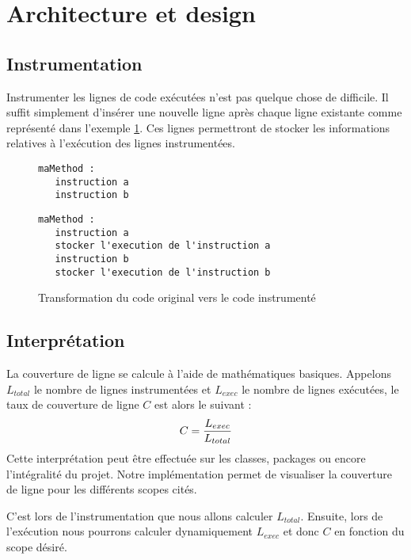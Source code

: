\section{Architecture et design}

\subsection{Instrumentation}
\label{instrumentation}

Instrumenter les lignes de code exécutées n'est pas quelque chose de difficile. Il suffit simplement d'insérer une nouvelle ligne après chaque ligne existante comme représenté dans l'exemple   \ref{example_instrumentation}. Ces lignes permettront de stocker les informations relatives à l'exécution des lignes instrumentées.

\begin{figure}[h]

\begin{minipage}{.45\linewidth}

\begin{lstlisting}[linewidth=5.0cm]
maMethod :		
   instruction a
   instruction b
\end{lstlisting}

\end{minipage}
\hfill
\begin{minipage}{.45\linewidth}

\begin{lstlisting}[linewidth=11cm]
maMethod :
   instruction a
   stocker l'execution de l'instruction a
   instruction b
   stocker l'execution de l'instruction b
\end{lstlisting}

\end{minipage}


\caption{Transformation du code original vers le code instrumenté}
\label{example_instrumentation}
\end{figure}

\subsection{Interprétation}
\label{interpretation}

La couverture de ligne se calcule à l'aide de mathématiques basiques. Appelons $L_{total}$ le nombre de lignes instrumentées et $L_{exec}$ le nombre de lignes exécutées, le taux de couverture de ligne $C$ est alors le suivant :
\begin{equation}
C = { L_{exec} \over L_{total} }
\end{equation}
Cette interprétation peut être effectuée sur les classes, packages ou encore l'intégralité du projet. Notre implémentation permet de visualiser la couverture de ligne pour les différents scopes cités.
\par C'est lors de l'instrumentation que nous allons calculer $L_{total}$. Ensuite, lors de l'exécution nous pourrons calculer dynamiquement $L_{exec}$ et donc $C$ en fonction du scope désiré.

